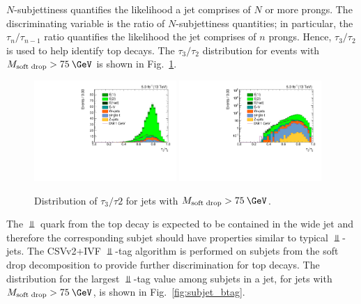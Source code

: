 $N$-subjettiness quantifies the likelihood a jet comprises of $N$ or more prongs. The discriminating variable is the ratio of $N$-subjettiness quantities; in particular, the $\tau_n/\tau_{n-1}$ ratio quantifies the likelihood the jet comprises of $n$ prongs. Hence, $\tau_3/\tau_2$ is used to help identify top decays. The $\tau_3/\tau_2$ distribution for events with $M_{\mbox{\scriptsize{soft drop}}}>75\:\GeV$ is shown in Fig.~\ref{fig:tau32}.

\begin{figure}[htbp]
  \centering
  \includegraphics[width=0.48\textwidth]{figures/tau32.pdf}
  \includegraphics[width=0.48\textwidth]{figures/tau32log.pdf}
  \caption{Distribution of $\tau_3/\tau2$ for jets with $M_{\mbox{\scriptsize{soft drop}}}>75\:\GeV$.}
  \label{fig:tau32}
\end{figure}

The $\Bot$ quark from the top decay is expected to be contained in the wide jet and therefore the corresponding subjet should have properties similar to typical $\Bot$-jets. The CSVv2+IVF $\Bot$-tag algorithm is performed on subjets from the soft drop decomposition to provide further discrimination for top decays. The distribution for the largest $\Bot$-tag value among subjets in a jet, for jets with $M_{\mbox{\scriptsize{soft drop}}}>75\:\GeV$, is shown in Fig.~\ref{fig:subjet_btag}.

